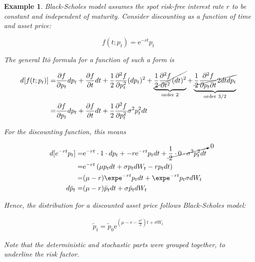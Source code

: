 \documentclass[oneside,titlepage,headinclude,12pt,a4paper,BCOR5mm,footinclude]{book}
\theoremstyle{defn}
\newtheorem{example}{Example}
\newcommand{\eexp}{\mathrm{e}}
\begin{document}
  \begin{example}
    Black-Scholes model assumes the \textit{spot risk-free interest rate} $r$ to
    be constant and independent of  maturity. Consider \textit{discounting} as a
    function of time and asset price:

    \[
      f(t;p_t) = \eexp^{-rt}p_t
    \]

    The general It\=o formula for a function of such a form is

    \begin{align*}
      d[f(t;p_t)] = & 
        \frac{\partial f}{\partial p_t} dp_t + 
        \frac{\partial f}{\partial t} dt + 
        \frac{1}{2} \frac{\partial^2 f}{\partial p_t^2} (dp_t)^2 +
        \underbrace{\cancel{\frac{1}{2} \frac{\partial^2 f}{\partial t^2} (dt)^2}}_\text{order 2} +
        \underbrace{\cancel{\frac{1}{2} \frac{\partial^2 f}{\partial p_t \partial t} 2dtdp_t}}_\text{order 3/2}
        \\
        = & 
        \frac{\partial f}{\partial p_t} dp_t + 
        \frac{\partial f}{\partial t} dt + 
        \frac{1}{2} \frac{\partial^2 f}{\partial p_t^2} \sigma^2 p_t^2dt
    \end{align*}

    For the discounting function, this means

    \begin{align*}
      d[e^{-rt}p_t] = & \eexp^{-rt} \cdot 1 \cdot dp_t + -r\eexp^{-rt}p_tdt +
        \cancelto{0}{\frac{1}{2} \cdot 0 \cdot \sigma^2 p_t^2 dt}
        \\
        = & \eexp^{-rt}\left( \mu p_t dt + \sigma p_t dW_t -r p_t dt \right)
        \\
        = & (\mu - r) \expe^{-rt} p_tdt + \expe^{-rt} p_t\sigma dW_t
        \\
      d\tilde{p}_t = & (\mu - r)\tilde{p}_tdt + \sigma \tilde{p}_t dW_t
    \end{align*}

    Hence, the distribution for a discounted asset price follows Black-Scholes model:

    \begin{align*}
      \tilde{p}_t = \tilde{p}_0 \eexp^{(\mu - r - \frac{\sigma^2}{2})t + \sigma W_t}
    \end{align*}

    Note that the  deterministic and stochastic parts were  grouped together, to
    underline the \textit{risk factor}.
  \end{example}
\end{document}
